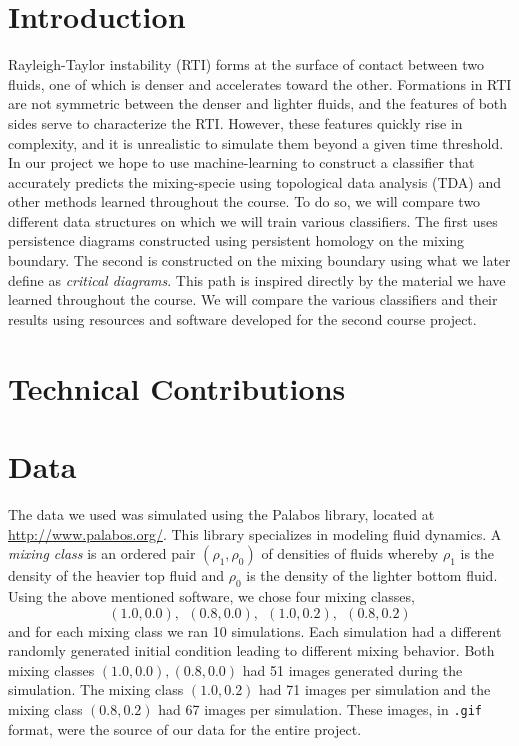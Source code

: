 \documentclass[12pt, fullpage,letterpaper]{article}
\theoremstyle{definition}
\begin{document}
	\section*{\normalfont Introduction}
	Rayleigh-Taylor instability (RTI) forms at the surface of contact between two fluids, one of which is denser and accelerates toward the other. Formations in RTI are not symmetric between the denser and lighter fluids, and the features of both sides serve to characterize the RTI. However, these features quickly rise in complexity, and it is unrealistic to simulate them beyond a given time threshold. In our project we hope to use machine-learning to construct a classifier that accurately predicts the mixing-specie using topological data analysis (TDA) and other methods learned throughout the course. To do so, we will compare two different data structures on which we will train various classifiers. The first uses persistence diagrams constructed using persistent homology on the mixing boundary. The second is constructed on the mixing boundary using what we later define as \emph{critical diagrams}. This path is inspired directly by the material we have learned throughout the course. We will compare the various classifiers and their results using resources and software developed for the second course project.
	
	\section*{\normalfont Technical Contributions} 
	\section*{\normalfont Data}
	The data we used was simulated using the Palabos library, located at \url{http://www.palabos.org/}. This library specializes in modeling fluid dynamics. A \emph{mixing class} is an ordered pair $(\rho_1, \rho_0)$ of densities of fluids whereby $\rho_1$ is the density of the heavier top fluid and $\rho_0$ is the density of the lighter bottom fluid. Using the above mentioned software, we chose four mixing classes, 
	$$
		(1.0, 0.0), \ \ (0.8, 0.0), \ \ (1.0, 0.2), \ \ (0.8, 0.2)
	$$
	and for each mixing class we ran 10 simulations. Each simulation had a different randomly generated initial condition leading to different mixing behavior. Both mixing classes $(1.0, 0.0), (0.8, 0.0)$ had 51 images generated during the simulation. The mixing class $(1.0, 0.2)$ had 71 images per simulation and the mixing class $(0.8, 0.2)$ had 67 images per simulation. These images, in \texttt{.gif} format, were the source of our data for the entire project. 
	
\end{document}
